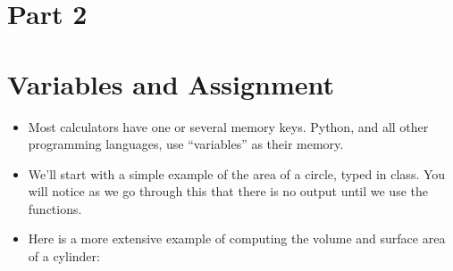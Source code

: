 \documentclass[letterpaper,10pt,english]{sphinxmanual}
\begin{document}
\section{Part 2}
\label{\detokenize{lecture_notes/lec02_calculator:part-2}}

\section{Variables and Assignment}
\label{\detokenize{lecture_notes/lec02_calculator:variables-and-assignment}}\begin{itemize}
\item {} 
Most calculators have one or several memory keys. Python, and all
other programming languages, use “variables” as their memory.

\item {} 
We’ll start with a simple example of the area of a circle, typed in
class. You will notice as we go through this that there is no output
until we use the  functions.

\item {} 
Here is a more extensive example of computing the volume and surface
area of a cylinder:

%
\begin{sphinxVerbatim}[commandchars=\\\{\}]
  
  
  
      
    
            
   
\end{sphinxVerbatim}


\end{itemize}
\end{document}

